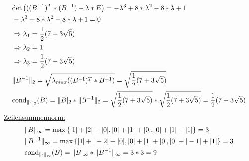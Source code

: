 \begin{align*}
\begin{split}
&\mathrm{det}\left(((B^{-1})^T*(B^{-1})-\lambda*E\right)=-\lambda^3+8*\lambda^2-8*\lambda+1\\
&-\lambda^3+8*\lambda^2-8*\lambda+1=0\\
&\Rightarrow \lambda_{1}=\frac{1}{2}(7+3\sqrt{5})\\
&\Rightarrow\lambda_{2}=1\\
&\Rightarrow\lambda_{3}=\frac{1}{2}(7-3\sqrt{5})\\
&\|B^{-1}\|_2=\sqrt{\lambda_{max}((B^{-1})^T*B^{-1})}=\sqrt{\frac{1}{2}(7+3\sqrt{5})}\\
&\mathrm{cond}_{\| \cdot \|_2}(B)=\|B|_2*\|B^{-1}\|_2=\sqrt{\frac{1}{2}(7+3\sqrt{5})}*\sqrt{\frac{1}{2}(7+3\sqrt{5})}=\frac{1}{2}(7+3\sqrt{5})
\end{split}
\end{align*}
\underline{Zeilensummennorm:}
\begin{align*}
\begin{split}
&\|B\|_\infty = \mathrm{max} \left\lbrace|1|+|2|+|0|, |0|+|1|+|0|,|0|+|1|+|1|\right\rbrace = 3\\
&\|B^{-1}\|_\infty = \mathrm{max} \left\lbrace|1|+|-2|+|0|, |0|+|1|+|0|,|0|+|-1|+|1|\right\rbrace = 3\\
&\mathrm{cond}_{\| \cdot \|_\infty}(B)=\|B|_\infty*\|B^{-1}\|_\infty = 3 * 3 = 9\\
\end{split}
\end{align*}
